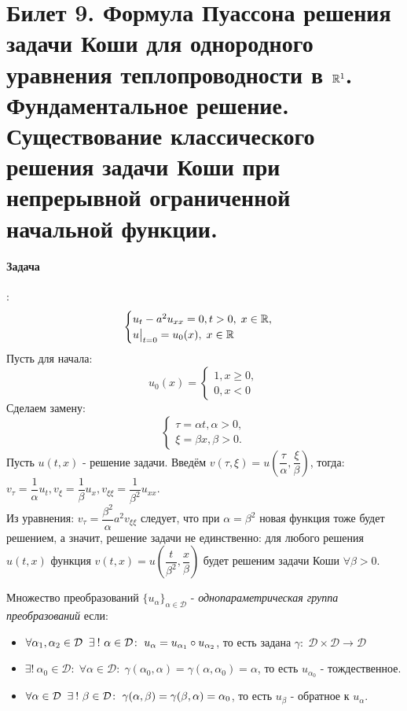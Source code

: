 \section{Билет 9. Формула Пуассона решения задачи Коши для однородного уравнения теплопроводности в \texorpdfstring{$\mathbb{R}^1$}{R}. Фундаментальное решение. Существование классического решения задачи Коши при непрерывной ограниченной начальной функции.}

\paragraph{Задача}:
\begin{equation*}
\begin{cases}
	u_t - a^2u_{xx} = 0, t > 0, \; x \in \mathbb{R}, \\
	u\bigr|_{t = 0} = u_0(x), \; x \in \mathbb{R}
\end{cases}
\end{equation*}
Пусть для начала:
\begin{equation*}
	u_0(x) = \begin{cases} 
1, x \geq 0, \\
0, x < 0 
\end{cases} 
\end{equation*}
Сделаем замену: 
\begin{equation*}
\begin{cases}
	\tau = \alpha t, \alpha > 0, \\
	\xi = \beta x, \beta > 0.
\end{cases}
\end{equation*}
Пусть $u(t, x)$ - решение задачи. Введём $v(\tau, \xi) = u\left(\dfrac{\tau}{\alpha}, \dfrac{\xi}{\beta}\right)$, тогда: $v_\tau = \dfrac{1}{\alpha}u_t, v_{\xi} = \dfrac{1}{\beta}u_x, v_{\xi \xi} = \dfrac{1}{\beta^2}u_{xx}$. \\
Из уравнения: $v_{\tau} = \dfrac{\beta^2}{\alpha}a^2v_{\xi \xi}$ следует, что при $\alpha = \beta^2$ новая функция тоже будет решением, а значит, решение задачи не единственно: для любого решения $u(t, x)$ функция $v(t, x) = u\left(\dfrac{t}{\beta^2}, \dfrac{x}{\beta}\right)$ будет решеним задачи Коши $\forall \beta > 0$.
\begin{definition} 
Множество преобразований $\{u_{\alpha}\}_{\alpha \in \mathcal{D}}$ - \textit{однопараметрическая группа преобразований} если:
\begin{itemize}
\item $\forall \alpha_1, \alpha_2 \in \mathcal{D} \;\;\exists\: !~ \alpha \in \mathcal{D}\colon\; u_{\alpha} = u_{\alpha_1} \circ u_{\alpha_2}$, то есть задана $\gamma\colon\; \mathcal{D} \times \mathcal{D} \to \mathcal{D}$
\item $\exists ! ~\alpha_{0} \in \mathcal{D}\colon\; \forall \alpha \in \mathcal{D}\colon\; \gamma(\alpha_0, \alpha) = \gamma(\alpha, \alpha_0) = \alpha$, то есть $u_{\alpha_0}$ - тождественное.
\item $\forall \alpha \in \mathcal{D}\;\;\exists\: !~ \beta \in \mathcal{D}\colon\; \gamma(\alpha, \beta) = \gamma(\beta, \alpha) = \alpha_0$, то есть $u_{\beta}$ - обратное к $u_{\alpha}$.
\end{itemize}
\end{definition}
